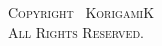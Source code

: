 \begin{titlepage}
\begin{center}
    \end{center}
    \begin{center}

    \end{center}
    \begin{center}
        \vfill
        \small\textsc{Copyright \textcopyright\, KorigamiK}\\
        \small\textsc{All Rights Reserved.}
    \end{center}
\end{titlepage}
\newpage